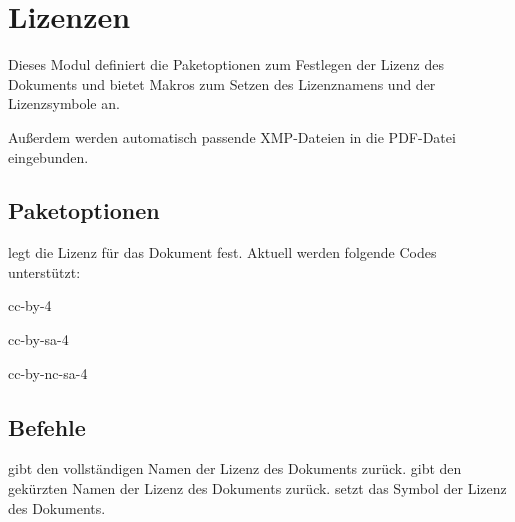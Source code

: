 \section{Lizenzen}
\label{modul:lizenzen}
Dieses Modul definiert die Paketoptionen zum Festlegen der Lizenz des
Dokuments und bietet Makros zum Setzen des Lizenznamens und der
Lizenzsymbole an.

Außerdem werden automatisch passende XMP-Dateien in die PDF-Datei
eingebunden.

\subsection{Paketoptionen}
\begin{options}
		legt die Lizenz für das Dokument fest. Aktuell werden
		folgende Codes unterstützt: \begin{smallitemize}
			\item cc-by-4
			\item cc-by-sa-4
			\item cc-by-nc-sa-4
		\end{smallitemize}
\end{options}

\subsection{Befehle}
\begin{commands}
		gibt den vollständigen Namen der Lizenz des Dokuments zurück.
		gibt den gekürzten Namen der Lizenz des Dokuments zurück.
		setzt das Symbol der Lizenz des Dokuments.

\end{commands}